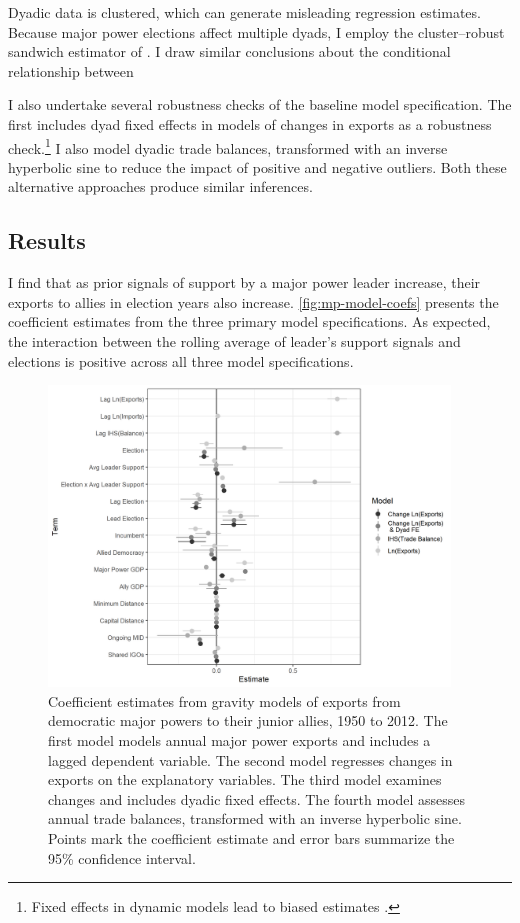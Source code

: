 \documentclass[12pt]{article}
\begin{document}
Dyadic data is clustered, which can generate misleading regression estimates.
Because major power elections affect multiple dyads, I employ the cluster--robust sandwich estimator of \citep{Aronowetal2015}.
I draw similar conclusions about the conditional relationship between 


I also undertake several robustness checks of the baseline model specification.
The first includes dyad fixed effects in models of changes in exports as a robustness check.\footnote{Fixed effects in dynamic models lead to biased estimates \citep{Nickell1981}.}
I also model dyadic trade balances, transformed with an inverse hyperbolic sine to reduce the impact of positive and negative outliers.
Both these alternative approaches produce similar inferences.


\subsection{Results}

I find that as prior signals of support by a major power leader increase, their exports to allies in election years also increase. 
\autoref{fig:mp-model-coefs} presents the coefficient estimates from the three primary model specifications.
As expected, the interaction between the rolling average of leader's support signals and elections is positive across all three model specifications.


\begin{figure}[htpb]
	\centering
		\includegraphics[width=0.95\textwidth]{../figures/mp-model-coefs.png}
	\caption{Coefficient estimates from gravity models of exports from democratic major powers to their junior allies, 1950 to 2012. The first model models annual major power exports and includes a lagged dependent variable. The second model regresses changes in exports on the explanatory variables. The third model examines changes and includes dyadic fixed effects. The fourth model assesses annual trade balances, transformed with an inverse hyperbolic sine. Points mark the coefficient estimate and error bars summarize the 95\% confidence interval.}
	\label{fig:mp-model-coefs}
\end{figure}
\end{document}
